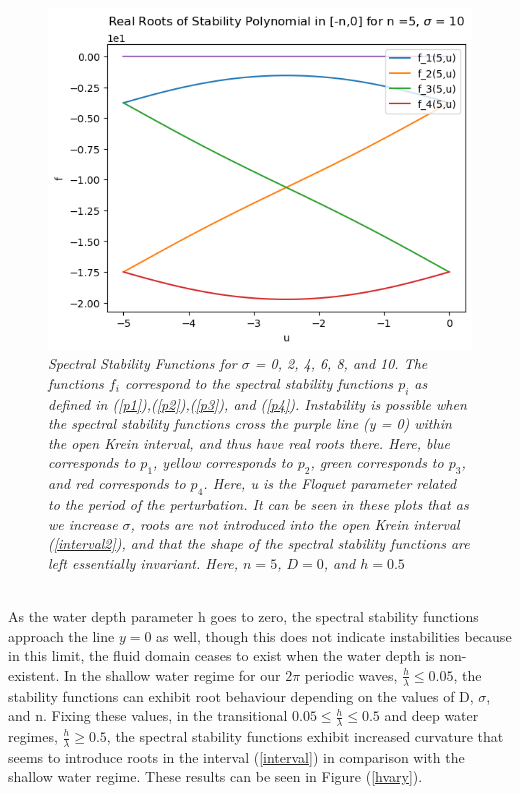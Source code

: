 \documentclass{article}
\begin{document}
\begin{figure}[hbt!]
\includegraphics[width=.47\textwidth]{sigma6.png}\hfill
\vspace{-15}
\caption{\emph{Spectral Stability Functions for \(\sigma\) = 0, 2, 4, 6, 8, and 10. The functions \(f_i\) correspond to the spectral stability functions \(p_i\) as defined in (\ref{p1}),(\ref{p2}),(\ref{p3}), and (\ref{p4}). Instability is possible when the spectral stability functions cross the purple line (y = 0) within the open Krein interval, and thus have real roots there. Here, blue corresponds to \(p_1\), yellow corresponds to \(p_2\), green corresponds to \(p_3\), and red corresponds to \(p_4\). Here, u is the Floquet parameter related to the period of the perturbation. It can be seen in these plots that as we increase \(\sigma\), roots are not introduced into the open Krein interval (\ref{interval2}), and that the shape of the spectral stability functions are left essentially invariant. Here, \(n = 5\), \(D = 0\), and \(h = 0.5\)}} \label{sigmavary}
\end{figure}


\\
As the water depth parameter h goes to zero, the spectral stability functions approach the line \(y = 0\) as well, though this does not indicate instabilities because in this limit, the fluid domain ceases to exist when the water depth is non-existent. In the shallow water regime for our \(2\pi\) periodic waves, \(\frac{h}{\lambda} \leq 0.05\), the stability functions can exhibit root behaviour depending on the values of D, \(\sigma\), and n. Fixing these values, in the transitional \(0.05 \leq \frac{h}{\lambda} \leq 0.5\) and deep water regimes, \(\frac{h}{\lambda} \geq 0.5\), the spectral stability functions exhibit increased curvature that seems to introduce roots in the interval (\ref{interval}) in comparison with the shallow water regime. These results can be seen in Figure (\ref{hvary}). \\

\clearpage
\end{document}
